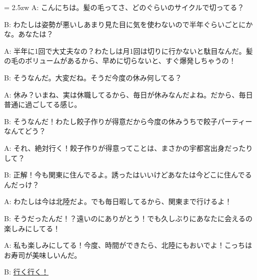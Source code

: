 \documentclass[11pt]{amsart}
\title{}
\author{}
\newenvironment{hangall}[1]{\hangindent = 2.5zw\everypar{\hangindent = 2.5zw}}{}
\begin{document}
\maketitle
\begin{hangall}{}%
A: こんにちは。髪の毛ってさ、どのぐらいのサイクルで切ってる？

B: わたしは姿勢が悪いしあまり見た目に気を使わないので半年ぐらいごとにかな。あなたは？

A: 半年に1回で大丈夫なの？わたしは月1回は切りに行かないと駄目なんだ。髪の毛のボリュームがあるから、早めに切らないと、すぐ爆発しちゃうの！

B: そうなんだ。大変だね。そうだ今度の休み何してる？

A: 休み？いまね、実は休職してるから、毎日が休みなんだよね。だから、毎日普通に過ごしてる感じ。

B: そうなんだ！わたし餃子作りが得意だから今度の休みうちで餃子パーティーなんてどう？

A: それ、絶対行く！餃子作りが得意ってことは、まさかの宇都宮出身だったりして？

B: 正解！今も関東に住んでるよ。誘ったはいいけどあなたは今どこに住んでるんだっけ？

A: わたしは今は北陸だよ。でも毎日暇してるから、関東まで行けるよ！

B: そうだったんだ！？遠いのにありがとう！でも久しぶりにあなたに会えるの楽しみにしてる！

A: 私も楽しみにしてる！今度、時間ができたら、北陸にもおいでよ！こっちはお寿司が美味しいんだ。

B: \ul{行く行く！}\end{hangall}
\end{document}
